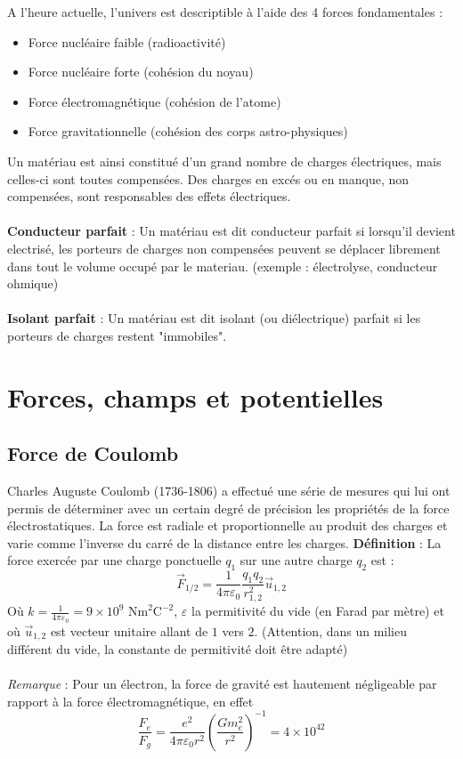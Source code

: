 A l'heure actuelle, l'univers est descriptible à l'aide des 4 forces fondamentales :
\begin{itemize}
\item Force nucléaire faible (radioactivité)
\item Force nucléaire forte (cohésion du noyau)
\item Force électromagnétique (cohésion de l'atome)
\item Force gravitationnelle (cohésion des corps astro-physiques)
\end{itemize}
Un matériau est ainsi constitué d'un grand nombre de charges électriques, mais celles-ci sont toutes compensées. Des charges en excés ou en manque, non compensées, sont responsables des effets électriques. \\\\
\noindent\textbf{Conducteur parfait} : Un matériau est dit conducteur parfait si lorsqu'il devient electrisé, les porteurs de charges non compensées peuvent se déplacer librement dans tout le volume occupé par le materiau. (exemple : électrolyse, conducteur ohmique)\\\\
\noindent\textbf{Isolant parfait} : Un matériau est dit isolant (ou diélectrique) parfait si les porteurs de charges restent "immobiles".

\section{Forces, champs et potentielles}
\subsection{Force de Coulomb}

\par Charles Auguste Coulomb (1736-1806) a effectué une série de mesures qui lui ont permis de déterminer avec un certain degré de précision les propriétés de la force électrostatiques. La force est radiale et proportionnelle au produit des charges et varie comme l'inverse du carré de la distance entre les charges.
\noindent\textbf{Définition} : La force exercée par une charge ponctuelle $q_1$ sur une autre charge $q_2$ est :
\[ \vec{F}_{1/2}=\frac{1}{4\pi\varepsilon_0}\frac{q_1q_2}{r_{1,2}^2}\vec{u}_{1,2} \]
Où $k=\frac{1}{4\pi\varepsilon_0}=9\times 10^9 \textrm{ Nm}^2\textrm{C}^{-2}$, $\varepsilon$ la permitivité du vide (en Farad par mètre) et où $\vec{u}_{1,2}$ est vecteur unitaire allant de $1$ vers $2$. (Attention, dans un milieu différent du vide, la constante de permitivité doit être adapté)
\\\\
\noindent\emph{Remarque} : Pour un électron, la force de gravité est hautement négligeable par rapport à la force électromagnétique, en effet \[ \frac{F_e}{F_g}=\frac{e^2}{4\pi\varepsilon_0 r^2}\left(\frac{Gm_e^2}{r^2}\right)^{-1}=4\times 10^{42} \]

